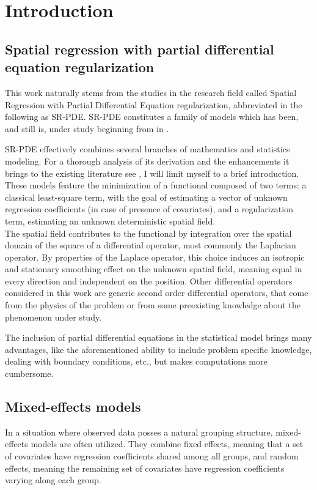 
\chapter{Introduction}
\label{ch:intro}

\section{Spatial regression with partial differential equation regularization}
This work naturally stems from the studies in the research field called Spatial
Regression with Partial Differential Equation regularization, abbreviated in
the following as SR-PDE. SR-PDE constitutes a family of models which has been,
and still is, under study beginning from \citeyear{sangalli0} in
\citeauthor{sangalli0} \cite{sangalli0}.

SR-PDE effectively combines several branches of mathematics and statistics
modeling. For a thorough analysis of its derivation and the enhancements it
brings to the existing literature see \cite{sangalli1}, I will limit myself to
a brief introduction.\\ These models feature the minimization of a functional
composed of two terms: a classical least-square term, with the goal of
estimating a vector of unknown regression coefficients (in case of presence of
covariates), and a regularization term, estimating an unknown deterministic
spatial field.\\ The spatial field contributes to the functional by integration
over the spatial domain of the square of a differential operator, most commonly
the Laplacian operator. By properties of the Laplace operator, this choice
induces an isotropic and stationary smoothing effect on the unknown spatial
field, meaning equal in every direction and independent on the position. Other
differential operators considered in this work are generic second order
differential operators, that come from the physics of the problem or from some
preexisting knowledge about the phenomenon under study.

The inclusion of partial differential equations in the statistical model brings
many advantages, like the aforementioned ability to include problem specific
knowledge, dealing with boundary conditions, etc., but makes computations more
cumbersome.

\section{Mixed-effects models}
In a situation where observed data posses a natural grouping structure,
mixed-effects models are often utilized. They combine fixed effects, meaning
that a set of covariates have regression coefficients shared among all groups,
and random effects, meaning the remaining set of covariates have regression
coefficients varying along each group.

